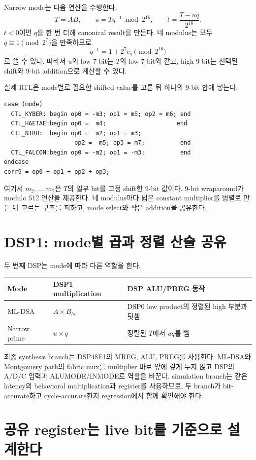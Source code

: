 Narrow mode는 다음 연산을 수행한다.
\[
T=A B,\qquad
u=Tq^{-1}\bmod 2^{16},\qquad
t=\frac{T-uq}{2^{16}}.
\]
$t<0$이면 $q$를 한 번 더해 canonical result를 만든다. 네 modulus는 모두
$q\equiv1\pmod{2^7}$을 만족하므로
\[
q^{-1}=1+2^7c_q\pmod{2^{16}}
\]
로 쓸 수 있다. 따라서 $u$의 low 7 bit는 $T$의 low 7 bit와 같고, high 9 bit는
선택된 shift와 9-bit addition으로 계산할 수 있다.

실제 RTL은 mode별로 필요한 shifted value를 고른 뒤 하나의 9-bit 합에 넣는다.

\begin{lstlisting}
case (mode)
  CTL_KYBER: begin op0 = -m3; op1 = m5; op2 = m6; end
  CTL_HAETAE:begin op0 =  m4;                    end
  CTL_NTRU:  begin op0 =  m2; op1 = m3;
                    op2 =  m5; op3 = m7;          end
  CTL_FALCON:begin op0 = -m2; op1 = -m3;          end
endcase
corr9 = op0 + op1 + op2 + op3;
\end{lstlisting}

여기서 $m_2,\ldots,m_7$은 $T$의 일부 bit를 고정 shift한 9-bit 값이다. 9-bit
wraparound가 modulo 512 연산을 제공한다. 네 modulus마다 넓은 constant multiplier를
병렬로 만든 뒤 고르는 구조를 피하고, mode select와 작은 addition을 공유한다.

\section{DSP1: mode별 곱과 정렬 산술 공유}

두 번째 DSP는 mode에 따라 다른 역할을 한다.

\begin{longtable}{L{29mm}L{57mm}L{75mm}}
\toprule
Mode & DSP1 multiplication & DSP ALU/PREG 동작 \\
\midrule
ML-DSA & $A\times B_{hi}$ & DSP0 low product의 정렬된 high 부분과 덧셈 \\
Narrow prime & $u\times q$ & 정렬된 $T$에서 $u q$를 뺌 \\
\bottomrule
\end{longtable}

최종 synthesis branch는 DSP48E1의 MREG, ALU, PREG를 사용한다. ML-DSA와
Montgomery path의 fabric mux를 multiplier 바로 앞에 깊게 두지 않고 DSP의
A/D/C 입력과 ALUMODE/INMODE로 역할을 바꾼다. simulation branch는 같은 latency의
behavioral multiplication과 register를 사용하므로, 두 branch가 bit-accurate하고
cycle-accurate한지 regression에서 함께 확인해야 한다.

\section{공유 register는 live bit를 기준으로 설계한다}

